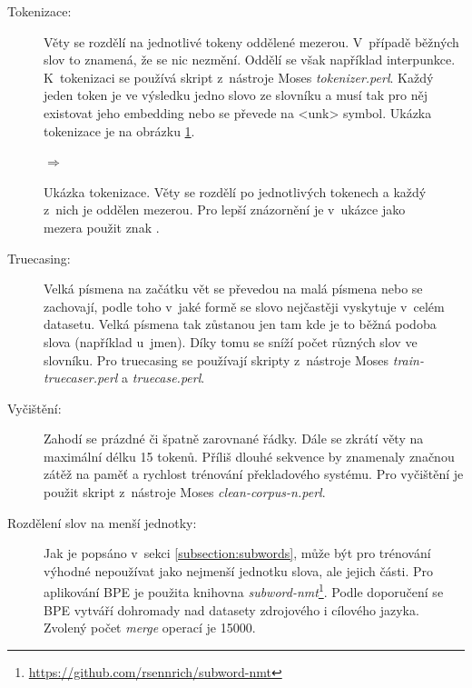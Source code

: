 \begin{description}
  \item[Tokenizace:] Věty se rozdělí na jednotlivé tokeny oddělené mezerou. V~případě běžných slov to znamená, že se nic nezmění. Oddělí se však například interpunkce. K~tokenizaci se používá skript z~nástroje Moses \emph{tokenizer.perl}. Každý jeden token je ve výsledku jedno slovo ze slovníku a musí tak pro něj existovat jeho embedding nebo se převede na <unk> symbol. Ukázka tokenizace je na obrázku \ref{img:tokenization}.
\end{description}

\begin{figure}[H]
    \begin{center}
     \setlength{\fboxsep}{8pt}
        $\Longrightarrow$
        \setlength{\fboxsep}{8pt}
    \end{center}
	\caption{Ukázka tokenizace. Věty se rozdělí po jednotlivých tokenech a každý z~nich je oddělen mezerou. Pro lepší znázornění je v~ukázce jako mezera použit znak \uv{\textvisiblespace}.}
	\label{img:tokenization}
\end{figure}


\begin{description}
  \item[Truecasing:] Velká písmena na začátku vět se převedou na malá písmena nebo se zachovají, podle toho v~jaké formě se slovo nejčastěji vyskytuje v~celém datasetu. Velká písmena tak zůstanou jen tam kde je to běžná podoba slova (například u~jmen). Díky tomu se sníží počet různých slov ve slovníku. Pro truecasing se používají skripty z~nástroje Moses \emph{train-truecaser.perl} a \emph{truecase.perl}.
\end{description}

\begin{description}
  \item[Vyčištění:] Zahodí se prázdné či špatně zarovnané řádky. Dále se zkrátí věty na maximální délku 15 tokenů. Příliš dlouhé sekvence by znamenaly značnou zátěž na paměť a rychlost trénování překladového systému. Pro vyčištění je použit skript z~nástroje Moses \emph{clean-corpus-n.perl}.
\end{description}

\begin{description}
  \item[Rozdělení slov na menší jednotky:]\label{description:bpeApplication} Jak je popsáno v~sekci \ref{subsection:subwords}, může být pro trénování výhodné nepoužívat jako nejmenší jednotku slova, ale jejich části. Pro aplikování BPE je použita knihovna \emph{subword-nmt}\footnote{\url{https://github.com/rsennrich/subword-nmt}}. Podle doporučení se BPE vytváří dohromady nad datasety zdrojového i cílového jazyka. Zvolený počet \emph{merge} operací je 15000.
\end{description}


